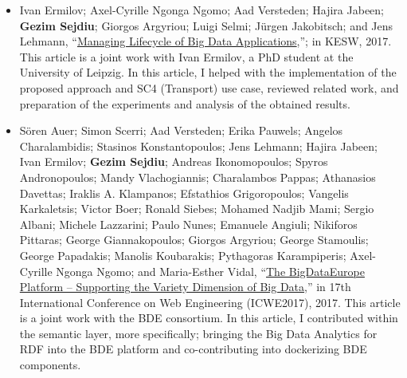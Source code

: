 \begin{itemize}
    \item Ivan Ermilov; Axel-Cyrille Ngonga Ngomo; Aad Versteden; Hajira Jabeen; \textbf{Gezim Sejdiu}; Giorgos Argyriou; Luigi Selmi; Jürgen Jakobitsch; and Jens Lehmann, “\href{https://svn.aksw.org/papers/2017/KESW_BDE_Workflow/public.pdf}{Managing Lifecycle of Big Data Applications},”; in KESW, 2017.
    This article is a joint work with Ivan Ermilov, a PhD student at the University of Leipzig. 
    In this article, I helped with the implementation of the proposed approach and SC4 (Transport) use case, reviewed related work, and preparation of the experiments and analysis of the obtained results.

    \item Sören Auer; Simon Scerri; Aad Versteden; Erika Pauwels; Angelos Charalambidis; Stasinos Konstantopoulos; Jens Lehmann; Hajira Jabeen; Ivan Ermilov; \textbf{Gezim Sejdiu}; Andreas Ikonomopoulos; Spyros Andronopoulos; Mandy Vlachogiannis; Charalambos Pappas; Athanasios Davettas; Iraklis A. Klampanos; Efstathios Grigoropoulos; Vangelis Karkaletsis; Victor Boer; Ronald Siebes; Mohamed Nadjib Mami; Sergio Albani; Michele Lazzarini; Paulo Nunes; Emanuele Angiuli; Nikiforos Pittaras; George Giannakopoulos; Giorgos Argyriou; George Stamoulis; George Papadakis; Manolis Koubarakis; Pythagoras Karampiperis; Axel-Cyrille Ngonga Ngomo; and Maria-Esther Vidal, “\href{http://jens-lehmann.org/files/2017/icwe_bde.pdf}{The BigDataEurope Platform – Supporting the Variety Dimension of Big Data},” in 17th International Conference on Web Engineering (ICWE2017), 2017.
    This article is a joint work with the BDE consortium. 
    In this article, I contributed within the semantic layer, more specifically; bringing the Big Data Analytics for \gls{RDF} into the BDE platform and co-contributing into dockerizing BDE components.
    
\end{itemize}

